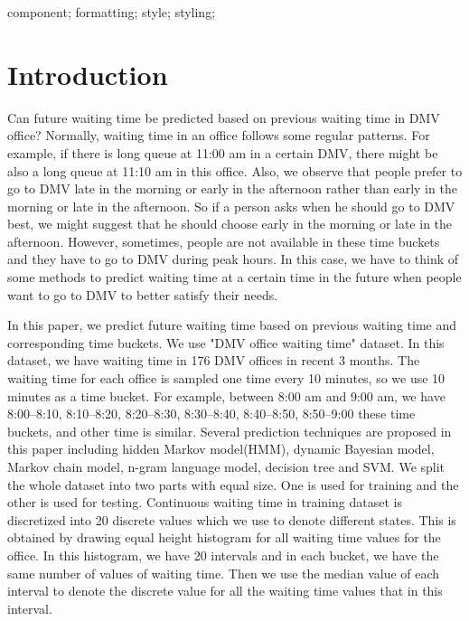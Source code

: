 \documentclass[10pt, conference, compsocconf]{IEEEtran}
\begin{document}
\begin{IEEEkeywords}
component; formatting; style; styling;

\end{IEEEkeywords}


%
\IEEEpeerreviewmaketitle



\section{Introduction}
Can future waiting time be predicted based on previous waiting time in DMV office? Normally, waiting time in an office follows some regular patterns. For example, if there is long queue at 11:00 am in a certain
DMV, there might be also a long queue at 11:10 am in this office. Also, we observe that people prefer to go to DMV late in the morning or early in the afternoon rather than
early in the morning or late in the afternoon. So if a person asks when he should go to DMV best, we might suggest that he should choose early in the morning or late in the afternoon.
However, sometimes, people are not available in these time buckets and they have to go to DMV  during peak hours. In this case, we have to think of some methods to predict waiting time at a certain time
in the future when people want to go to DMV to better satisfy their needs. 

In this paper, we predict future waiting time based on previous waiting time and corresponding time buckets. We use "DMV
office waiting time" dataset. In this dataset, we have waiting time in 176 DMV offices in recent 3 months. The waiting time for each office is sampled one time every 10 minutes, so we use 10 minutes as 
a time bucket. For example, between 8:00 am and 9:00 am, we have 8:00--8:10, 8:10--8:20, 8:20--8:30, 8:30--8:40, 8:40--8:50, 8:50--9:00 these time buckets, and other time is similar. Several prediction techniques
are proposed in this paper including hidden Markov model(HMM), dynamic Bayesian model, Markov chain model, n-gram language model, decision tree and SVM. We split the whole dataset into two parts
with equal size. One is used for training and the other is used for testing. Continuous waiting time in training dataset is discretized into 20 discrete values which we use to denote different states. This is obtained by drawing equal height histogram for all waiting time values for the office. In this histogram, we have 20 intervals and in each bucket, we have the same number of values of waiting time. Then we use the median value of each interval to denote the discrete value for all the waiting time values that in this interval.
\end{document}
